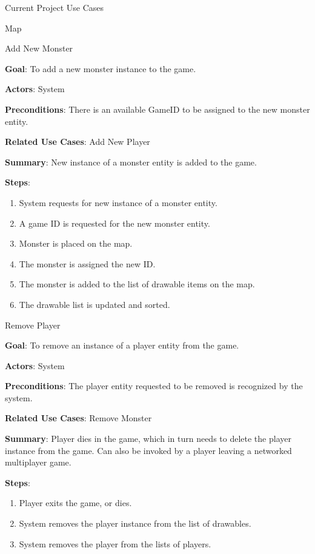 \documentclass[12pt]{report}
\begin{document}
\begin{chapter}{Current Project Use Cases}
\begin{section}{Map}
    \begin{subsection}{Add New Monster} 

      \textbf{Goal}: 
      To add a new monster instance to the game.

      \textbf{Actors}: 
      System

      \textbf{Preconditions}: 
      There is an available GameID to be assigned to the new monster entity.

      \textbf{Related Use Cases}: 
      Add New Player

      \textbf{Summary}: 
      New instance of a monster entity is added to the game. 

      \textbf{Steps}:
      \begin{enumerate}
	\item System requests for new instance of a monster entity.
	\item A game ID is requested for the new monster entity.
	\item Monster is placed on the map.
      	\item The monster is assigned the new ID.
      	\item The monster is added to the list of drawable items on the map.
      	\item The drawable list is updated and sorted.
      \end{enumerate}
    \end{subsection}  
  
    \begin{subsection}{Remove Player}

      \textbf{Goal}: 
      To remove an instance of a player entity from the game.

      \textbf{Actors}: 
      System

      \textbf{Preconditions}: 
      The player entity requested to be removed is recognized by the system.

      \textbf{Related Use Cases}: 
      Remove Monster

      \textbf{Summary}: 
      Player dies in the game, which in turn needs to delete the player instance from the game. Can also be invoked by a player leaving a networked multiplayer game.

      \textbf{Steps}:
      \begin{enumerate}
	\item Player exits the game, or dies.
	\item System removes the player instance from the list of drawables.
	\item System removes the player from the lists of players.
      \end{enumerate}
    \end{subsection}
    


\end{section}
\end{chapter}
\end{document}

